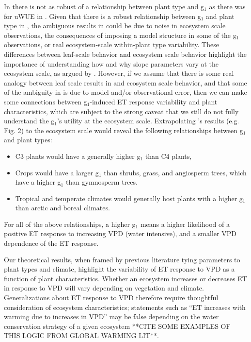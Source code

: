 In \citet{Medlyn_2017} there is not as robust of a relationship
between plant type and g$_1$ as there was for uWUE in
\citet{Zhou_2015}. Given that there is a robust relationship between
g$_1$ and plant type in \citet{Lin_2015}, the ambiguous results in
\citet{Medlyn_2017} could be due to noise in ecosystem scale
observations, the consequences of imposing a model structure in some
of the g$_1$ observations, or real ecosystem-scale within-plant type
variability. These differences between leaf-scale behavior and
ecosystem scale behavior highlight the importance of understanding how
and why slope parameters vary at the ecosystem scale, as argued by
\citet{Medlyn_2017}. However, if we assume that there is some real
analogy between leaf scale results in \citet{Lin_2015} and ecosystem
scale behavior, and that some of the ambiguity in \citet{Medlyn_2017}
is due to model and/or observational error, then we can make some
connections between g$_1$-induced ET response variability and plant
characteristics, which are subject to the strong caveat that we still
do not fully understand the g$_1$'s utility at the ecosystem
scale. Extrapolating \citet{Lin_2015}'s results (e.g. Fig. 2) to the
ecosystem scale would reveal the following relationships between g$_1$
and plant types:

\begin{itemize}
  \item C3 plants would have a generally higher g$_1$ than C4 plants,
  \item Crops would have a larger g$_1$ than shrubs, grass, and
    angiosperm trees, which have a higher g$_1$ than gymnosperm
    trees.
  \item Tropical and temperate climates would generally host plants
    with a higher g$_1$ than arctic and boreal climates.
\end{itemize}
For all of the above relationships, a higher g$_1$ means a higher
likelihood of a positive ET response to increasing VPD (water
intensive), and a smaller VPD dependence of the ET response.

Our theoretical results, when framed by previous literature tying
parameters to plant types and climate, highlight the variability of ET
response to VPD as a function of plant characteristics. Whether an
ecosystem increases or decreases ET in response to VPD will vary
depending on vegetation and climate. Generalizations about ET response
to VPD therefore require thoughtful consideration of ecosystem
characteristics; statements such as ``ET increases with warming due to
increases in VPD'' may be false depending on the water conservation
strategy of a given ecosystem **CITE SOME EXAMPLES OF THIS LOGIC FROM
GLOBAL WARMING LIT**.

